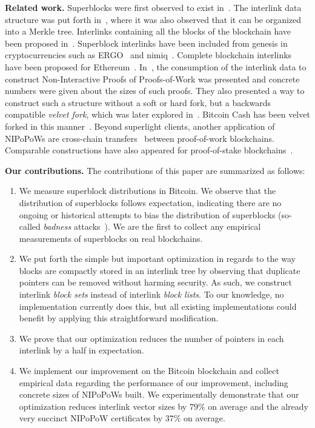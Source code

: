 \noindent
\textbf{Related work.}
Superblocks were first observed to exist in~\cite{highway}.
The interlink data structure was put forth in~\cite{popow}, where it was also
observed that it can be organized into a Merkle tree. Interlinks containing all
the blocks of the blockchain have been
proposed in~\cite{flyclient}. Superblock interlinks have
been included from genesis in cryptocurrencies such as ERGO~\cite{ergo} and
nimiq~\cite{nimiq}. Complete blockchain interlinks have been proposed for Ethereum~\cite{eip210}. In~\cite{nipopows}, the consumption of the interlink data to
construct Non-Interactive Proofs of Proofs-of-Work was presented and concrete
numbers were given about the sizes of such proofs. They also presented a way to
construct such a structure without a soft or hard fork, but a backwards
compatible \emph{velvet fork}, which was later explored in~\cite{velvet}.
Bitcoin Cash has been velvet forked in this manner~\cite{gtklocker}. Beyond
superlight clients, another
application of NIPoPoWs are cross-chain transfers~\cite{pow-sidechains}
between proof-of-work blockchains. Comparable
constructions have also appeared for proof-of-stake
blockchains~\cite{pos-sidechains}.

\noindent
\textbf{Our contributions.} The contributions of this paper are summarized as
follows:

\begin{enumerate}
  \item We measure superblock distributions in Bitcoin. We observe that the
        distribution of superblocks follows expectation, indicating there are no
        ongoing or historical attempts to bias the distribution of superblocks
        (so-called \emph{badness} attacks~\cite{nipopows}). We are the first to
        collect any empirical measurements of superblocks on real blockchains.
  \item We put forth the simple but important optimization in regards to the way
        blocks are compactly stored in an interlink tree by observing that
        duplicate pointers can be removed without harming security. As such, we
        construct interlink \emph{block sets} instead of interlink \emph{block
        lists}. To our knowledge, no implementation currently does this, but all
        existing implementations could benefit by applying this straightforward
        modification.
  \item We prove that our optimization reduces the number of pointers in each
        interlink by a half in expectation.
  \item We implement our improvement on the Bitcoin blockchain and collect
        empirical data regarding the performance of our improvement, including
        concrete sizes of NIPoPoWs built. We experimentally demonstrate that our
        optimization reduces interlink vector sizes by $79\%$ on average and
        the already very succinct NIPoPoW certificates by $37\%$ on average.
\end{enumerate}
